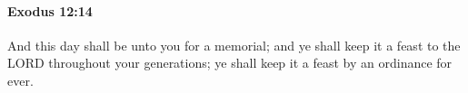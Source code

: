 
		\paragraph{Exodus 12:14} %
			\label{EXODUS-12-14}

			And this day shall be unto you for a memorial; and ye shall keep it a feast to the LORD throughout your generations; ye shall keep it a feast by an ordinance for ever.


